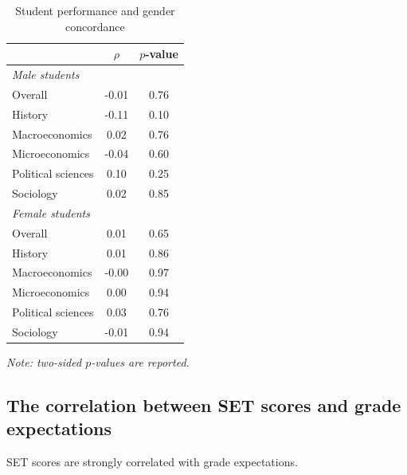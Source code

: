 \documentclass[12pt]{article}
\begin{document}
\begin{table}[htbp]
  \centering
  \footnotesize 
  \caption{Student performance and gender concordance}
    \begin{tabular}{lcc}
    \toprule 
                          & $\rho$  & $p$-value   \\
   \midrule
     \multicolumn{3}{l}{\textit{Male students}} \\     
      \quad  Overall &                 -0.01       & 0.76      \\
      \quad  History &                 -0.11       & 0.10      \\
      \quad  Macroeconomics &           0.02       & 0.76      \\
      \quad  Microeconomics &          -0.04       & 0.60      \\
      \quad  Political sciences &       0.10       & 0.25      \\
      \quad  Sociology &                0.02       & 0.85      \\
   \midrule
     \multicolumn{3}{l}{\textit{Female students}} \\     
      \quad  Overall &                  0.01       & 0.65        \\
      \quad  History &                  0.01       & 0.86        \\
      \quad  Macroeconomics &          -0.00       & 0.97        \\
      \quad  Microeconomics &           0.00       & 0.94      \\
      \quad  Political sciences &       0.03       & 0.76        \\
      \quad  Sociology &               -0.01       & 0.94        \\
    \bottomrule
    \end{tabular}%
 \label{tab:finalconcordance}%
  
  \textit{Note: two-sided $p$-values are reported.}
\end{table}%
\normalsize





\subsection{The correlation between SET scores and grade expectations}

SET scores are strongly correlated with grade expectations.   
\end{document}

